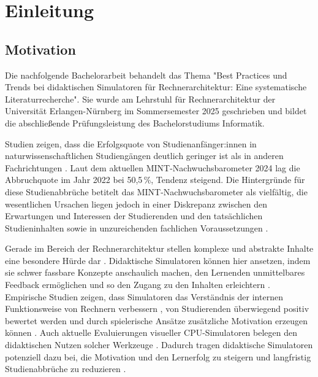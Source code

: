 \chapter{Einleitung}

\section{Motivation}

Die nachfolgende Bachelorarbeit behandelt das Thema "Best Practices und Trends bei didaktischen Simulatoren für Rechnerarchitektur: Eine systematische Literaturrecherche". Sie wurde am Lehrstuhl für Rechnerarchitektur der Universität Erlangen-Nürnberg im Sommersemester 2025 geschrieben und bildet die abschließende Prüfungsleistung des Bachelorstudiums Informatik.


Studien zeigen, dass die Erfolgsquote von Studienanfänger:innen in naturwissenschaftlichen Studiengängen deutlich geringer ist als in anderen Fachrichtungen \parencite[S.~370]{burdinski_lehrvideos_2024}. Laut dem aktuellen MINT-Nachwuchsbarometer 2024 lag die Abbruchquote im Jahr 2022 bei 50,5\,\%, Tendenz steigend. Die Hintergründe für diese Studienabbrüche betitelt das MINT-Nachwuchsbarometer als vielfältig, die wesentlichen Ursachen liegen jedoch in einer Diskrepanz zwischen den Erwartungen und Interessen der Studierenden und den tatsächlichen Studieninhalten sowie in unzureichenden fachlichen Voraussetzungen \parencite[S.~21]{joachim_herz_stiftung_mint_2024}.

Gerade im Bereich der Rechnerarchitektur stellen komplexe und abstrakte Inhalte eine besondere Hürde dar \parencite[S.~1]{grober_championship_2022}. Didaktische Simulatoren können hier ansetzen, indem sie schwer fassbare Konzepte anschaulich machen, den Lernenden unmittelbares Feedback ermöglichen und so den Zugang zu den Inhalten erleichtern \parencite[S.~11]{zeichner_using_2020}. Empirische Studien zeigen, dass Simulatoren das Verständnis der internen Funktionsweise von Rechnern verbessern \parencite[S.~215]{prasad_using_2015}, von Studierenden überwiegend positiv bewertet werden \parencite[S.~8]{besim_understanding_2012} und durch spielerische Ansätze zusätzliche Motivation erzeugen können \parencite[S.~453]{schlag_gamifizierung_2021}. Auch aktuelle Evaluierungen visueller CPU-Simulatoren belegen den didaktischen Nutzen solcher Werkzeuge \parencites[S.~11]{maxnuck_soares_use_2016}[S.~75]{cortinovis_further_2024}. Dadurch tragen didaktische Simulatoren potenziell dazu bei, die Motivation und den Lernerfolg zu steigern und langfristig Studienabbrüche zu reduzieren \parencite[S.~272]{kornelsen_expedition_2005}.

